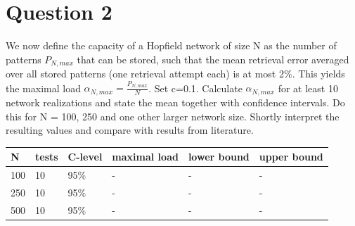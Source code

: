 \section{Question 2}
\small
\begin{itshape}
We now define the capacity of a Hopfield network of size N as the number of patterns $P_{N,max}$ that
can be stored, such that the mean retrieval error averaged over all stored patterns (one retrieval
attempt each) is at most 2$\%$. This yields the maximal load $\alpha_{N,max} = \frac{P_{N,max} }{N}$.
Set c=0.1. Calculate $\alpha_{N,max}$ for at least 10 network realizations and state the mean together with confidence intervals. Do this for N = 100, 250 and one other larger network size. Shortly interpret the resulting values and compare with results from literature.
\end{itshape}

\begin{table}
\centering
\begin{tabular}{|l|l|l|l|l|l|}
\hline
N & tests & C-level & maximal load & lower bound & upper bound \\ 
\hline
\hline
100 & 10 & 95$\%$ & - & - & - \\
250 & 10 & 95$\%$ & - & - & - \\
500 & 10 & 95$\%$ & - & - & - \\
\hline
\end{tabular}
\end{table}

